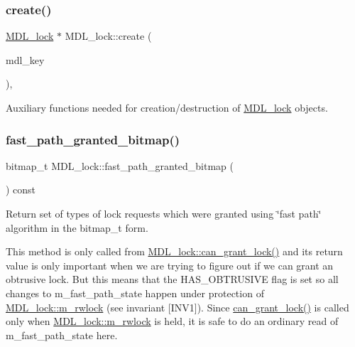 \subsubsection{\texorpdfstring{create()}{create()}}
{\footnotesize\ttfamily \mbox{\hyperlink{classMDL__lock}{M\+D\+L\+\_\+lock}} $\ast$ M\+D\+L\+\_\+lock\+::create (\begin{DoxyParamCaption}\item[{const \mbox{\hyperlink{structMDL__key}{M\+D\+L\+\_\+key}} $\ast$}]{mdl\+\_\+key }\end{DoxyParamCaption})\hspace{0.3cm}{\ttfamily [inline]}, {\ttfamily [static]}}

Auxiliary functions needed for creation/destruction of \mbox{\hyperlink{classMDL__lock}{M\+D\+L\+\_\+lock}} objects. \mbox{\label{classMDL__lock_a44d77e8b91c3f09ac46adb6dccf7a460}} 
\subsubsection{\texorpdfstring{fast\+\_\+path\+\_\+granted\+\_\+bitmap()}{fast\_path\_granted\_bitmap()}}
{\footnotesize\ttfamily bitmap\+\_\+t M\+D\+L\+\_\+lock\+::fast\+\_\+path\+\_\+granted\+\_\+bitmap (\begin{DoxyParamCaption}{ }\end{DoxyParamCaption}) const\hspace{0.3cm}{\ttfamily [inline]}}

Return set of types of lock requests which were granted using \char`\"{}fast path\char`\"{} algorithm in the bitmap\+\_\+t form.

This method is only called from \mbox{\hyperlink{classMDL__lock_a8d8e8e3b98525a6c8de14a745dd3ce8f}{M\+D\+L\+\_\+lock\+::can\+\_\+grant\+\_\+lock()}} and its return value is only important when we are trying to figure out if we can grant an obtrusive lock. But this means that the H\+A\+S\+\_\+\+O\+B\+T\+R\+U\+S\+I\+VE flag is set so all changes to m\+\_\+fast\+\_\+path\+\_\+state happen under protection of \mbox{\hyperlink{classMDL__lock_a1308b4506d8cb6d754b4f173e3aa4962}{M\+D\+L\+\_\+lock\+::m\+\_\+rwlock}} (see invariant \mbox{[}I\+N\+V1\mbox{]}). Since \mbox{\hyperlink{classMDL__lock_a8d8e8e3b98525a6c8de14a745dd3ce8f}{can\+\_\+grant\+\_\+lock()}} is called only when \mbox{\hyperlink{classMDL__lock_a1308b4506d8cb6d754b4f173e3aa4962}{M\+D\+L\+\_\+lock\+::m\+\_\+rwlock}} is held, it is safe to do an ordinary read of m\+\_\+fast\+\_\+path\+\_\+state here. \mbox{\label{classMDL__lock_afc838e4678e75b56554e1ca142439dce}} 
